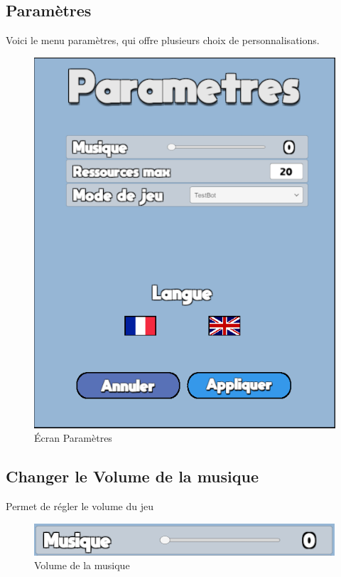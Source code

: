 \documentclass{report}
\begin{document}
\subsection{Paramètres}
Voici le menu paramètres, qui offre plusieurs choix de personnalisations.
\begin{figure}[!h]
	\centering
		\includegraphics[scale=0.50]{Ecran_Parametre}
	\caption{Écran Paramètres}
\end{figure}


\subsection{Changer le Volume de la musique}
Permet de régler le volume du jeu
\begin{figure}[!h]
	\centering
		\includegraphics[scale=0.80]{Control_Musique}
	\caption{Volume de la musique}
\end{figure}
\end{document}
